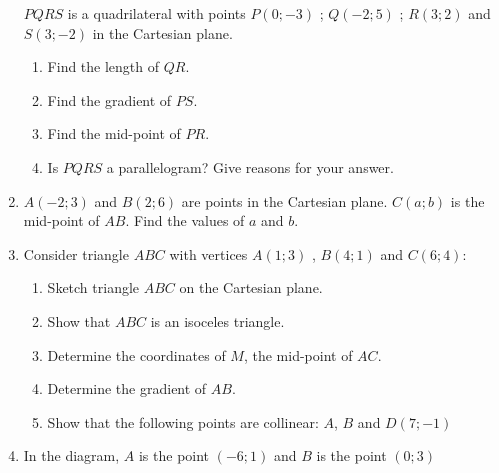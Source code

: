 \begin{eocexercises}{}
\begin{enumerate}[noitemsep, label=\textbf{\arabic*}. ]
$PQRS$ is a quadrilateral with points $P(0;-3)$ ; $Q(-2;5)$ ; $R(3;2)$ and $S(3;-2)$  in the Cartesian plane.
 \begin{enumerate}[noitemsep, label=\textbf{(\alph*)} ]
\item Find the length of $QR$.
\item Find the gradient of $PS$.
\item Find the mid-point of $PR$.
\item Is $PQRS$ a parallelogram?  Give reasons for your answer.
 \end{enumerate}
\item $A(-2;3)$ and $B(2;6)$ are points in the Cartesian plane. $C(a;b)$ is the mid-point of $AB$. Find the values of $a$ and $b$.
\item 
Consider triangle $ABC$ with vertices $A(1; 3)$ , $B(4;1)$ and $C (6; 4)$:
 \begin{enumerate}[noitemsep, label=\textbf{(\alph*)} ]
\item Sketch triangle $ABC$ on the Cartesian plane. 
\item Show that $ABC$ is an isoceles triangle.
\item Determine the coordinates of $M$, the mid-point of $AC$.
\item Determine the gradient of $AB$.
\item Show that the following points are collinear: $A$, $B$ and $D(7;-1)$
\end{enumerate}
\item In the diagram, $A$ is the point $(-6;1)$ and $B$ is the point $(0;3)$
\setcounter{subfigure}{0}
\begin{figure}[H] %
\begin{center}
\end{center}
\end{figure} 

\end{enumerate}
\end{eocexercises}
